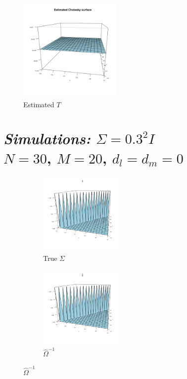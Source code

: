 \documentclass[12pt]{article}
\theoremstyle{definition}
\begin{document}
    \begin{center}
    \begin{figure}[H]
    \graphicspath{{img/}}
 \includegraphics[width=5cm]{identity-cov-estimated-cholesky}
 \caption{Estimated $T$ }
 \end{figure}
     \end{center}
  

 


 
\section{\emph{Simulations: }$\Sigma = 0.3^2 I$\\
$N = 30$, $M=20$, $d_l = d_m= 0$}

\begin{center}
\begin{figure}[H] \label{row-col-differencing}
 \begin{subfigure}{.48\textwidth}
 \includegraphics[width=4cm]{img/identity-cov-true-covariance}
 \caption{True $\Sigma$ }
 \end{subfigure}
 \begin{subfigure}{.48\textwidth}
  \includegraphics[width=4cm]{img/identity-cov-estimated-covariance}
 \caption{$\hat{\Omega}^{-1}$}
 \end{subfigure}
 \end{figure}
     \end{center}
\end{document}
